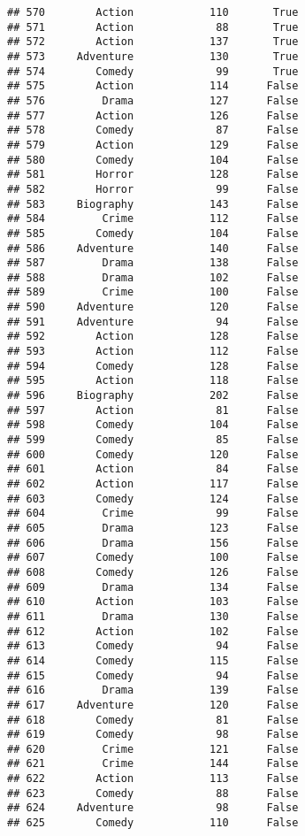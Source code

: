 \documentclass[
]{article}
\begin{document}
\begin{verbatim}
## 570        Action            110       True
## 571        Action             88       True
## 572        Action            137       True
## 573     Adventure            130       True
## 574        Comedy             99       True
## 575        Action            114      False
## 576         Drama            127      False
## 577        Action            126      False
## 578        Comedy             87      False
## 579        Action            129      False
## 580        Comedy            104      False
## 581        Horror            128      False
## 582        Horror             99      False
## 583     Biography            143      False
## 584         Crime            112      False
## 585        Comedy            104      False
## 586     Adventure            140      False
## 587         Drama            138      False
## 588         Drama            102      False
## 589         Crime            100      False
## 590     Adventure            120      False
## 591     Adventure             94      False
## 592        Action            128      False
## 593        Action            112      False
## 594        Comedy            128      False
## 595        Action            118      False
## 596     Biography            202      False
## 597        Action             81      False
## 598        Comedy            104      False
## 599        Comedy             85      False
## 600        Comedy            120      False
## 601        Action             84      False
## 602        Action            117      False
## 603        Comedy            124      False
## 604         Crime             99      False
## 605         Drama            123      False
## 606         Drama            156      False
## 607        Comedy            100      False
## 608        Comedy            126      False
## 609         Drama            134      False
## 610        Action            103      False
## 611         Drama            130      False
## 612        Action            102      False
## 613        Comedy             94      False
## 614        Comedy            115      False
## 615        Comedy             94      False
## 616         Drama            139      False
## 617     Adventure            120      False
## 618        Comedy             81      False
## 619        Comedy             98      False
## 620         Crime            121      False
## 621         Crime            144      False
## 622        Action            113      False
## 623        Comedy             88      False
## 624     Adventure             98      False
## 625        Comedy            110      False

\end{verbatim}
\end{document}
